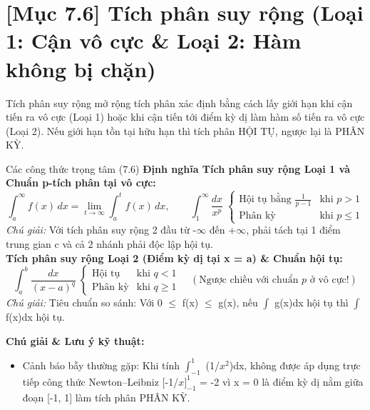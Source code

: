 \documentclass[11pt,a4paper,oneside]{book}
\begin{document}
\section{[Mục 7.6] Tích phân suy rộng (Loại 1: Cận vô cực \& Loại 2: Hàm không bị chặn)}
Tích phân suy rộng mở rộng tích phân xác định bằng cách lấy giới hạn khi cận tiến ra vô cực (Loại 1) hoặc khi cận tiến tới điểm kỳ dị làm hàm số tiến ra vô cực (Loại 2). Nếu giới hạn tồn tại hữu hạn thì tích phân HỘI TỤ, ngược lại là PHÂN KỲ.

\begin{congthuc}{Các công thức trọng tâm (7.6)}
\noindent\textbf{Định nghĩa Tích phân suy rộng Loại 1 và Chuẩn p-tích phân tại vô cực:}
\[ \int_a^\infty f(x)\,dx = \lim_{t \to \infty} \int_a^t f(x)\,dx, \qquad \int_1^\infty \frac{dx}{x^p} \;\begin{cases} \text{Hội tụ bằng } \frac{1}{p-1} & \text{khi } p > 1 \\ \text{Phân kỳ} & \text{khi } p \le 1 \end{cases} \]
\noindent\textit{Chú giải:} Với tích phân suy rộng 2 đầu từ -$\infty$ đến +$\infty$, phải tách tại 1 điểm trung gian c và cả 2 nhánh phải độc lập hội tụ.\\[4pt]
\noindent\textbf{Tích phân suy rộng Loại 2 (Điểm kỳ dị tại x = a) \& Chuẩn hội tụ:}
\[ \int_a^b \frac{dx}{(x - a)^q} \;\begin{cases} \text{Hội tụ} & \text{khi } q < 1 \\ \text{Phân kỳ} & \text{khi } q \ge 1 \end{cases} \quad (\text{Ngược chiều với chuẩn } p \text{ ở vô cực!}) \]
\noindent\textit{Chú giải:} Tiêu chuẩn so sánh: Với 0 $\le$  f(x) $\le$  g(x), nếu $\int$ g(x)dx hội tụ thì $\int$ f(x)dx hội tụ.\\[4pt]
\end{congthuc}

\noindent\textbf{Chú giải \& Lưu ý kỹ thuật:}
\begin{itemize}[leftmargin=1.5em, itemsep=2pt]
  \item Cảnh báo bẫy thường gặp: Khi tính $\int_{-1}^1$ (1/$x^2$)dx, không được áp dụng trực tiếp công thức Newton–Leibniz [-1/$x]_{-1}^1$ = -2 vì x = 0 là điểm kỳ dị nằm giữa đoạn [-1, 1] làm tích phân PHÂN KỲ.
\end{itemize}
\end{document}
